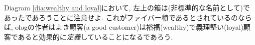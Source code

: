 \begin{remark}\label{rem:defining using pullbacks}


Diagram \eqref{dia:wealthy and loyal}において, 左上の箱は(非標準的な名前として)であったであろうことに注意せよ. これがファイバー積であるとされているのならば, ologの作者はよき顧客(a good customer)は裕福(wealthy)で義理堅い(loyal)顧客であると効果的に\emph{定義}していることになるであろう.

\end{remark}


